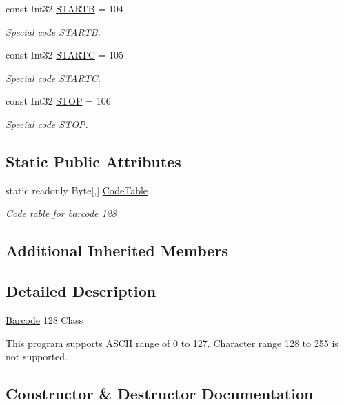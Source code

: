 \begin{DoxyCompactItemize}
const Int32 \hyperlink{class_pdf_file_writer_1_1_barcode128_a68c1ce0002244e5c6243fd6cc1fed53b}{S\+T\+A\+R\+TB} = 104
\begin{DoxyCompactList}\small\item\em Special code S\+T\+A\+R\+TB. \end{DoxyCompactList}\item 
const Int32 \hyperlink{class_pdf_file_writer_1_1_barcode128_ac389824c9cfc244f13597ea299c4fec4}{S\+T\+A\+R\+TC} = 105
\begin{DoxyCompactList}\small\item\em Special code S\+T\+A\+R\+TC. \end{DoxyCompactList}\item 
const Int32 \hyperlink{class_pdf_file_writer_1_1_barcode128_ab7d5c6442bb38247a30c4cc577ad1ed3}{S\+T\+OP} = 106
\begin{DoxyCompactList}\small\item\em Special code S\+T\+OP. \end{DoxyCompactList}\end{DoxyCompactItemize}
\subsection*{Static Public Attributes}
\begin{DoxyCompactItemize}
\item 
static readonly Byte\mbox{[},\mbox{]} \hyperlink{class_pdf_file_writer_1_1_barcode128_a81c19f70c45b1fa1dbeafba18820e0c4}{Code\+Table}
\begin{DoxyCompactList}\small\item\em Code table for barcode 128 \end{DoxyCompactList}\end{DoxyCompactItemize}
\subsection*{Additional Inherited Members}


\subsection{Detailed Description}
\hyperlink{class_pdf_file_writer_1_1_barcode}{Barcode} 128 Class 

This program supports A\+S\+C\+II range of 0 to 127. Character range 128 to 255 is not supported. 

\subsection{Constructor \& Destructor Documentation}

